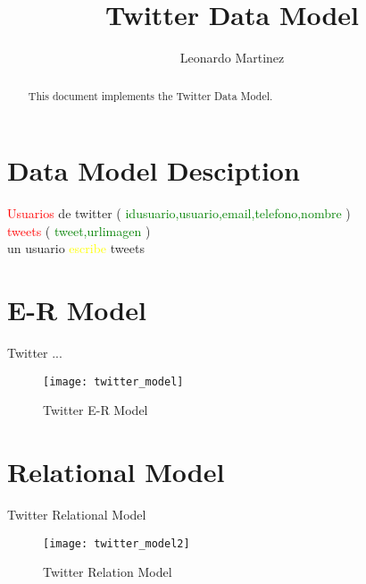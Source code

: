 \documentclass[10pt]{article}         %
\title{Twitter Data Model}
\author{Leonardo Martinez}
\begin{document}
\maketitle

\begin{abstract}
This document implements the Twitter Data Model.
\end{abstract}

\section{Data Model Desciption}


\textcolor{red}{Usuarios} de twitter ( \textcolor{green}{idusuario,usuario,email,telefono,nombre} )\\

\textcolor{red}{tweets} ( \textcolor{green}{tweet,urlimagen} )\\

un usuario \textcolor{yellow}{escribe} tweets

\section{E-R Model}

Twitter ...
\begin{figure}[h]
     \texttt{[image: twitter\_model]}
     \caption{Twitter E-R Model}
\end{figure}

\section{Relational Model}
Twitter Relational Model

 \begin{figure}[h]
     \texttt{[image: twitter\_model2]}
     \caption{Twitter Relation Model}
\end{figure}
\end{document}
